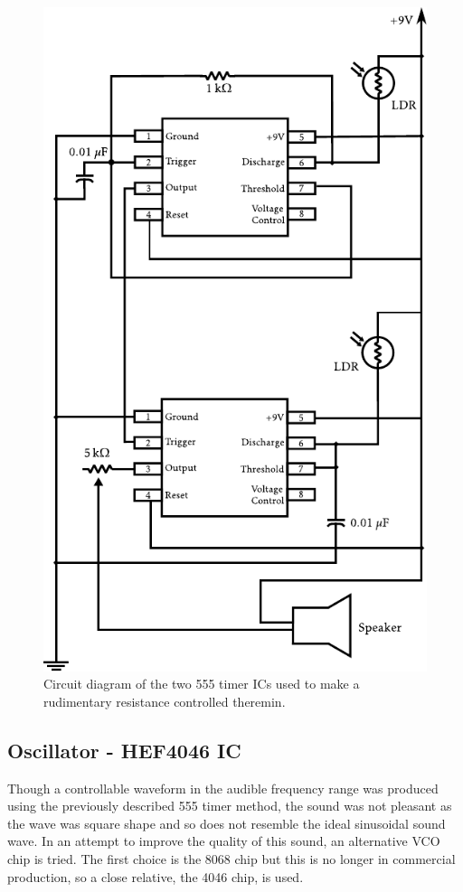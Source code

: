 \begin{figure}[htbp]
	\begin{center}
		\includegraphics[scale=0.8,angle=90]{report_img/2x555}
		\caption{Circuit diagram of the two 555 timer ICs used to make a rudimentary resistance controlled theremin.}
		\label{fig:2x555}
	\end{center}
\end{figure}

\subsection{Oscillator - HEF4046 IC}
\label{sec:4046}
Though a controllable waveform in the audible frequency range was produced using the previously described 555 timer method, the sound was not pleasant as the wave was square shape and so does not resemble the ideal sinusoidal sound wave. In an attempt to improve the quality of this sound, an alternative VCO chip is tried. The first choice is the 8068 chip but this is no longer in commercial production, so a close relative, the 4046 chip, is used.

